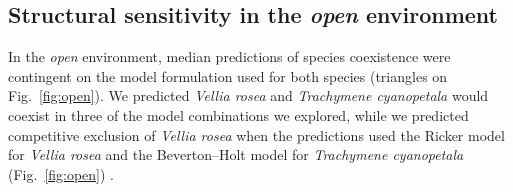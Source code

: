 \begin{refsection}
\begin{table}[H]
\centering
\fontsize{12}{10}\selectfont
\caption[Model comparison in the \emph{open} and \emph{woody} environments]{Model comparison in the \emph{open} and \emph{woody} environments. LOOIC (leave-one-out cross-validation information criteria) penalizes models for the number of parameters, and the lowest value reflects the best-performing model. The weight for each model is an estimate of the probability that the model will make the best predictions of new data based on the the set of models considered.}
\label{tab:compare}
\end{table}

\subsection*{Structural sensitivity in the \emph{open} environment}

In the \textit{open} environment, median predictions of species coexistence were contingent on the model formulation used for both species (triangles on Fig.~\ref{fig:open}). We predicted \textit{Vellia rosea} and \textit{Trachymene cyanopetala} would coexist in three of the model combinations we explored, while we predicted competitive exclusion of \textit{Vellia rosea} when the predictions used the Ricker model for \textit{Vellia rosea} and the Beverton--Holt model for \textit{Trachymene cyanopetala} (Fig.~\ref{fig:open}) .


\end{refsection}
